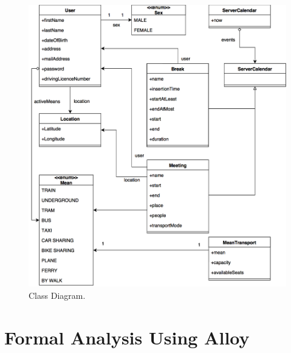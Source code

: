 \documentclass{article}
\begin{document}
	\begin{figure}[h!]
		\bigskip
		\centering
		\includegraphics[scale=0.25]{img/diagrams/cd.png}
		\caption{Class Diagram.}
	\end{figure}
	
	
	\section{Formal Analysis Using Alloy}
\end{document}
